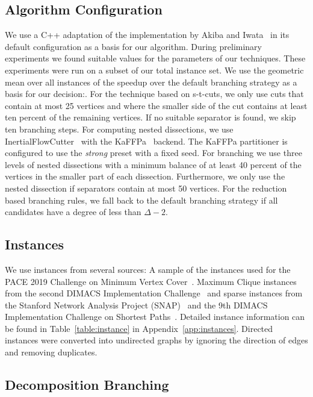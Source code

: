\documentclass[a4paper,UKenglish,cleveref, autoref, thm-restate]{lipics-v2021}
\begin{document}
\subsection{Algorithm Configuration}
\label{sec:algo_conf}
We use a C++ adaptation of the implementation by Akiba and
Iwata~\cite{AkibaIwata} in its default configuration as a basis for our algorithm. During preliminary experiments we found
suitable values for the parameters of
our techniques. These experiments were run on a subset of our total instance
set. We use the geometric mean over all instances of the speedup over the
default branching strategy as a basis for our decision:. For the technique based on
s-t-cuts, we only use cuts that contain at most 25 vertices and where the smaller side of
the cut contains at least ten percent of the remaining vertices. If no suitable separator is found, we skip ten branching steps. For computing nested dissections, we use 
InertialFlowCutter~\cite{gottesburen2019faster}
with the KaFFPa~\cite{DBLP:conf/wea/SandersS13}
backend. The KaFFPa partitioner is configured to use the \emph{strong} preset
with a fixed seed. For branching we use
three levels of nested dissections with a minimum balance of at least 40 percent of the vertices in the smaller part of each dissection. Furthermore, we
only use the nested dissection if separators contain at most
50 vertices. For the reduction based
branching rules, we fall back to the default branching strategy if all
candidates have a degree of less than $\Delta - 2$. 

\subsection{Instances}
We use instances from several sources: A sample of the instances used for the
PACE 2019 Challenge on Minimum Vertex Cover~\cite{dzulfikar_et_al:LIPIcs:2019:11486}. Maximum Clique instances from the second
DIMACS Implementation Challenge~\cite{johnson1993cliques} and sparse instances from
the Stanford Network Analysis Project (SNAP)~\cite{snapnets} and the 9th DIMACS
Implementation Challenge on Shortest Paths~\cite{demetrescu2009shortest}. Detailed instance information can
be found in Table~\ref{table:instance} in Appendix~\ref{app:instances}. Directed instances were converted into
undirected graphs by ignoring the direction of edges and removing duplicates.

\subsection{Decomposition Branching}
\label{sec:experiments_decomp}
\end{document}
